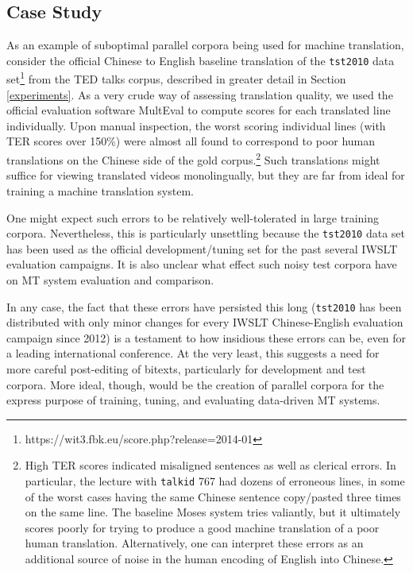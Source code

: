 \subsection{Case Study}
\label{case_study}


As an example of suboptimal parallel corpora being used for machine translation, consider the official Chinese to English baseline translation of the {\small \tt tst2010} data set\footnote{https://wit3.fbk.eu/score.php?release=2014-01} from the TED talks corpus, described in greater detail in Section \ref{experiments}.
As a very crude way of assessing translation quality, we used the official evaluation software MultEval  to compute scores for each translated line individually.
Upon manual inspection, the worst scoring individual lines (with TER scores over 150\%) were almost all found to correspond to poor human translations on the Chinese side of the gold corpus.\footnote{
    High TER scores indicated misaligned sentences as well as clerical errors.  In particular, the lecture with {\small \tt talkid} 767 had dozens of erroneous lines, in some of the worst cases having the same Chinese sentence copy/pasted three times on the same line. 
    The baseline Moses system tries valiantly, but it ultimately scores poorly for trying to produce a good machine translation of a poor human translation.
    Alternatively, one can interpret these errors as an additional source of noise in the human encoding of English into Chinese.
}
Such translations might suffice for viewing translated videos monolingually, but they are far from ideal for training a machine translation system.

One might expect such errors to be relatively well-tolerated in large training corpora. 
Nevertheless, this is particularly unsettling because the {\small \tt tst2010} data set has been used as the official development/tuning set for the past several IWSLT evaluation campaigns. 
It is also unclear what effect such noisy test corpora have on MT system evaluation and comparison.

In any case, the fact that these errors have persisted this long ({\small \tt tst2010} has been distributed with only minor changes for every IWSLT Chinese-English evaluation campaign since 2012) is a testament to how insidious these errors can be, even for a leading international conference. 
At the very least, this suggests a need for more careful post-editing of bitexts, particularly for development and test corpora.
More ideal, though, would be the creation of parallel corpora for the express purpose of training, tuning, and evaluating data-driven MT systems.



